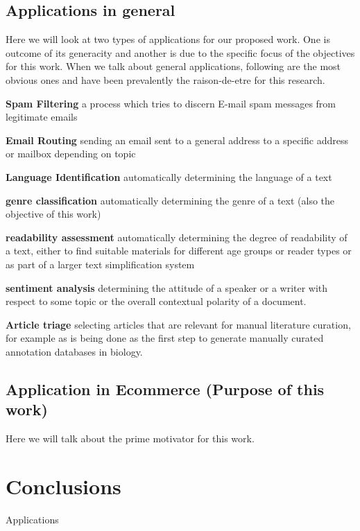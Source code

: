 \documentclass[12pt]{book}
\begin{document}
\section{Applications in general}
Here we will look at two types of applications for our proposed work. One is outcome of its generacity and another is due to the specific focus of the objectives for this work. When we talk about general applications, following are the most obvious ones and
have been prevalently the raison-de-etre for this research.
\begin{itemize*}
  \item \textbf{Spam Filtering} a process which tries to discern E-mail spam messages from legitimate emails
  \item \textbf{Email Routing} sending an email sent to a general address to a specific address or mailbox depending on topic
  \item \textbf{Language Identification} automatically determining the language of a text
  \item \textbf{genre classification} automatically determining the genre of a text (also the objective of this work)
  \item \textbf{readability assessment} automatically determining the degree of readability of a text, either to find suitable materials for different age groups or reader types or as part of a larger text simplification system 
  \item \textbf{sentiment analysis} determining the attitude of a speaker or a writer with respect to some topic or the overall contextual polarity of a document.
  \item \textbf{Article triage} selecting articles that are relevant for manual literature curation, for example as is being done as the first step to generate manually curated annotation databases in biology.
\end{itemize*}

\section{Application in Ecommerce (Purpose of this work)}
Here we will talk about the prime motivator for this work. 


\chapter{Conclusions}
Applications
\end{document}
